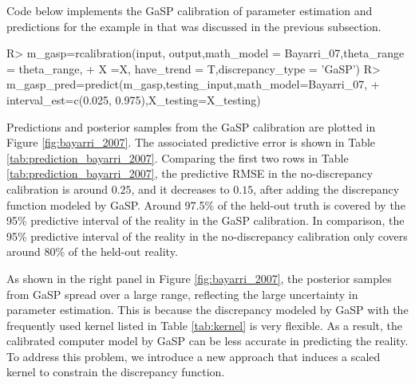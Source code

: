 Code below implements the GaSP calibration of parameter estimation and predictions for the example in \citep{bayarri2007framework} that was discussed in the previous subsection. 
\begin{example}
R> m_gasp=rcalibration(input, output,math_model = Bayarri_07,theta_range = theta_range,
+                     X =X, have_trend = T,discrepancy_type = 'GaSP')
R> m_gasp_pred=predict(m_gasp,testing_input,math_model=Bayarri_07,
+                     interval_est=c(0.025, 0.975),X_testing=X_testing) 
\end{example}







Predictions and posterior samples from the GaSP calibration are plotted in Figure  \ref{fig:bayarri_2007}. The associated predictive error is shown in Table \ref{tab:prediction_bayarri_2007}.  Comparing the first two rows in Table \ref{tab:prediction_bayarri_2007},  the predictive RMSE in the no-discrepancy calibration is around $0.25$, and it decreases to $0.15$, after adding the discrepancy function modeled by GaSP. Around 97.5\% of the held-out truth is covered by the 95\%  {predictive interval} of the reality in the GaSP calibration. In comparison, the 95\%  predictive interval of the reality in the no-discrepancy calibration only covers around $80\%$ of the held-out reality. 


As shown in the right panel in Figure \ref{fig:bayarri_2007},  the posterior samples from GaSP  spread over a large range, reflecting the large uncertainty in  parameter estimation. This is because the discrepancy modeled by GaSP with the frequently used kernel listed in Table \ref{tab:kernel} is very flexible. As a result, the calibrated computer model by GaSP can be less accurate in predicting the reality. To address this problem, we introduce a new approach that induces a scaled kernel to constrain the discrepancy function.



